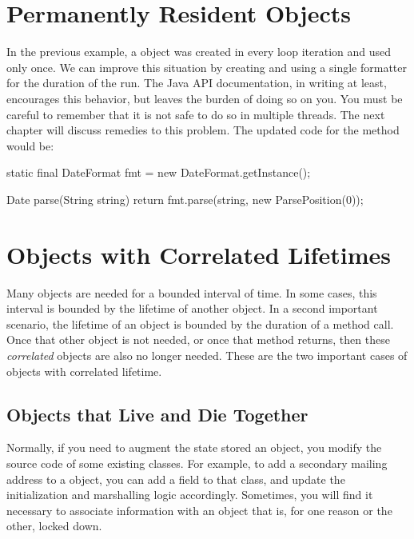 



\section{Permanently Resident Objects}
\label{sec:forever-lifetime}

In the previous example, a  object was created in every loop
iteration and used only once. We can improve this situation by creating and using
a single formatter for the duration of the run. The Java API documentation, in
writing at least, encourages this behavior, but leaves the burden of doing so on
you. You must be careful to remember that it is not safe to do so in multiple
threads. The next chapter will discuss remedies to this problem. The updated code
for the  method would be:

\begin{shortlisting}
static final DateFormat fmt = new DateFormat.getInstance();

Date parse(String string) {
	return fmt.parse(string, new ParsePosition(0));
}
\end{shortlisting} 

\section{Objects with Correlated Lifetimes}
\label{sec:correlated-lifetime}

Many objects are needed for a bounded interval of time. In some cases, this
interval is bounded by the lifetime of another object. In a second important
scenario, the lifetime of an object is bounded by the duration of a method call.
Once that other object is not needed, or once that method returns, then these
\emph{correlated} objects are also no longer needed. These are the two important
cases of objects with correlated lifetime.

\subsection{Objects that Live and Die Together}
\label{sec:correlated-lifetime-1}

Normally, if you need to augment the state stored an object, you modify
the source code of some existing classes. For example, to add a secondary
mailing address to a  object, you can add a field to that class, and update the
initialization and marshalling logic accordingly. Sometimes, you will find it
necessary to associate information with an object that is, for one reason or the
other, locked down.

